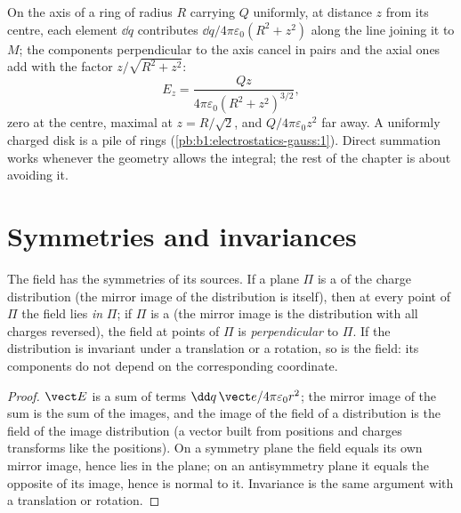 \begin{example}\label{ex:b1:electrostatics-gauss:ring}
On the axis of a ring of radius $R$ carrying $Q$ uniformly, at distance
$z$ from its centre, each element $\dd q$ contributes $\dd q/4\pi\varepsilon_0(R^2 +
z^2)$ along the line joining it to $M$; the components perpendicular
to the axis cancel in pairs and the axial ones add with the factor
$z/\sqrt{R^2 + z^2}$:
\[
E_z = \frac{Qz}{4\pi\varepsilon_0(R^2 + z^2)^{3/2}} ,
\]
zero at the centre, maximal at $z = R/\sqrt2$, and $Q/4\pi\varepsilon_0z^2$ far
away. A uniformly charged disk is a pile of rings (\cref{pb:b1:electrostatics-gauss:1}).
Direct summation works whenever the geometry allows the integral; the
rest of the chapter is about avoiding it.
\end{example}

\section{Symmetries and invariances}

\begin{proposition}\label{prop:b1:electrostatics-gauss:symmetry}
The field has the symmetries of its sources. If a plane $\Pi$ is a
\emph{} of the charge distribution (the mirror image
of the distribution is itself), then at every point of $\Pi$ the field
lies \emph{in} $\Pi$; if $\Pi$ is a \emph{}
(the mirror image is the distribution with all charges reversed), the
field at points of $\Pi$ is \emph{perpendicular} to $\Pi$. If the
distribution is invariant under a translation or a rotation, so is the
field: its components do not depend on the corresponding coordinate.
\end{proposition}

\begin{proof}
$\vect E$ is a sum of terms $\dd q\,\vect e/4\pi\varepsilon_0r^2$; the mirror
image of the sum is the sum of the images, and the image of the field
of a distribution is the field of the image distribution (a vector
built from positions and charges transforms like the positions). On a
symmetry plane the field equals its own mirror image, hence lies in the
plane; on an antisymmetry plane it equals the opposite of its image,
hence is normal to it. Invariance is the same argument with a
translation or rotation.
\end{proof}

